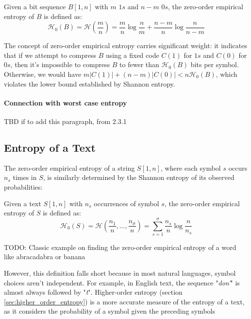 \begin{definition}
    Given a bit sequence $B[1, n]$ with $m$ $1s$ and $n-m$ $0s$, the zero-order empirical entropy of $B$ is defined as:
   \begin{equation}
     \mathcal{H}_0(B) = \mathcal{H} \left( \frac{m}{n} \right) =\frac{m}{n} \log \frac{n}{m} + \frac{n-m}{n} \log \frac{n}{n-m}
   \end{equation}
\end{definition}
\noindent The concept of zero-order empirical entropy carries significant weight: it indicates that if we attempt to compress $B$ using a fixed code $C(1)$ for $1s$ and $C(0)$ for $0s$, then it's impossible to compress $B$ to fewer than $\mathcal{H}_0(B)$ bits per symbol. Otherwise, we would have $m |C(1)| + (n-m) |C(0)| < n \mathcal{H}_0(B)$, which violates the lower bound established by Shannon entropy.

\paragraph{Connection with worst case entropy}
TBD if to add this paragraph, from \cite{navarro2016compact} 2.3.1

\subsection{Entropy of a Text}
The zero-order empirical entropy of a string $S[1, n]$, where each symbol $s$ occurs $n_s$ times in $S$, is similarly determined by the Shannon entropy of its observed probabilities:
\begin{definition}
    Given a text $S[1, n]$ with $n_s$ occurrences of symbol $s$, the zero-order empirical entropy of $S$ is defined as:
    \begin{equation}
        \mathcal{H}_0(S) = \mathcal{H} \left( \frac{n_1}{n} , \ldots, \frac{n_{\sigma}}{n} \right) =  \sum_{s=1}^{\sigma} \frac{n_s}{n} \log \frac{n}{n_s}
    \end{equation}
\end{definition}
\begin{example}
    TODO: Classic example on finding the zero-order empirical entropy of a word like abracadabra or banana
\end{example}
However, this definition falls short because in most natural languages, symbol choices aren't independent. For example, in English text, the sequence "\emph{don'}" is almost always followed by "\emph{t}". Higher-order entropy (section \ref{sec:higher_order_entropy}) is a more accurate measure of the entropy of a text, as it considers the probability of a symbol given the preceding symbols
